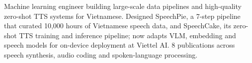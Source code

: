 

\begin{cvparagraph}

Machine learning engineer building large-scale data pipelines and high-quality zero-shot TTS systems for Vietnamese. Designed SpeechPie, a 7-step pipeline that curated 10,000 hours of Vietnamese speech data, and SpeechCake, its zero-shot TTS training and inference pipeline; now adapts VLM, embedding and speech models for on-device deployment at Viettel AI. 8 publications across speech synthesis, audio coding and spoken-language processing.

\end{cvparagraph}
